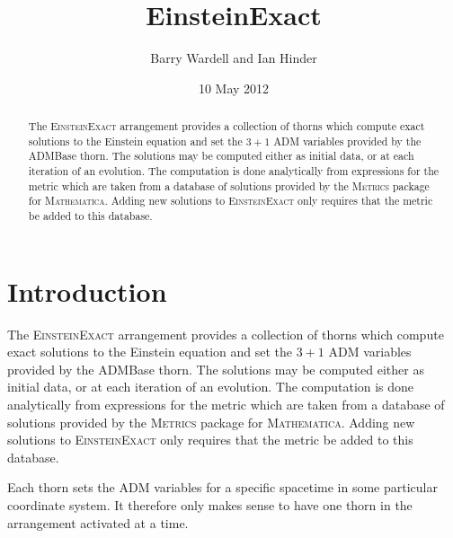 \documentclass{article}
\begin{document}
\author{Barry Wardell and Ian Hinder}
\title{EinsteinExact}
\date{10 May 2012}

\maketitle


\begin{abstract}
The \textsc{EinsteinExact} arrangement provides a collection of thorns which compute
exact solutions to the Einstein equation and set the $3+1$ ADM variables
provided by the ADMBase thorn. The solutions may be computed either as initial
data, or at each iteration of an evolution. The computation is done analytically
from expressions for the metric which are taken from a database of solutions
provided by the \textsc{Metrics} package for \textsc{Mathematica}. Adding new
solutions to \textsc{EinsteinExact} only requires that the metric be added to this
database.
\end{abstract}

\section{Introduction}
The \textsc{EinsteinExact} arrangement provides a collection of thorns which compute
exact solutions to the Einstein equation and set the $3+1$ ADM variables
provided by the ADMBase thorn. The solutions may be computed either as initial
data, or at each iteration of an evolution. The computation is done analytically
from expressions for the metric which are taken from a database of solutions
provided by the \textsc{Metrics} package for \textsc{Mathematica}. Adding new
solutions to \textsc{EinsteinExact} only requires that the metric be added to this
database.

Each thorn sets the ADM variables for a specific spacetime in some
particular coordinate system. It therefore only makes sense to have one
thorn in the arrangement activated at a time.
\end{document}

